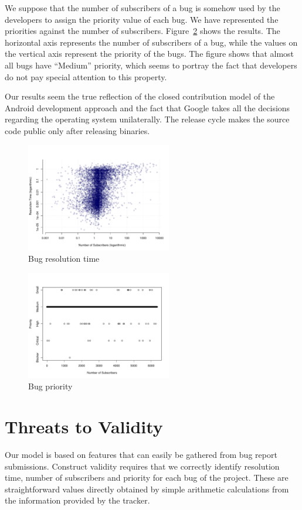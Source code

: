 \documentclass[10pt, conference, compsocconf]{IEEEtran}
\begin{document}
We suppose that the number of  subscribers of a bug is somehow used by the developers to assign the priority value of each bug. We have represented the priorities against the number of subscribers. Figure~\ref{fig:stars-priority} shows the results. The horizontal axis represents the number of subscribers of a bug, while the values on the vertical axis represent the priority of the bugs. The figure shows that almost all bugs have “Medium” priority, which seems to portray the fact that developers do not pay special attention to this property.

Our results seem the true reflection of the closed contribution model of the Android development approach and the fact that Google takes all the decisions regarding the operating system unilaterally. The release cycle makes the source code public only after releasing binaries. 

\begin{figure}[!t]
\centering
\includegraphics[width=2.5in]{stars-duration-log}
\caption{Bug resolution time}
\label{fig:stars-duration}
\end{figure}

\begin{figure}[!t]
\centering
\includegraphics[width=2.5in]{stars-priority}
\caption{Bug priority}
\label{fig:stars-priority}
\end{figure}

\section{Threats to Validity}
\label{sec:threats}
Our model is based on features that can easily be gathered from bug report submissions. Construct validity requires that we correctly identify resolution time, number of subscribers and priority for each bug of the project. These are straightforward values directly obtained by simple arithmetic calculations from the information provided by the tracker.
\end{document}
